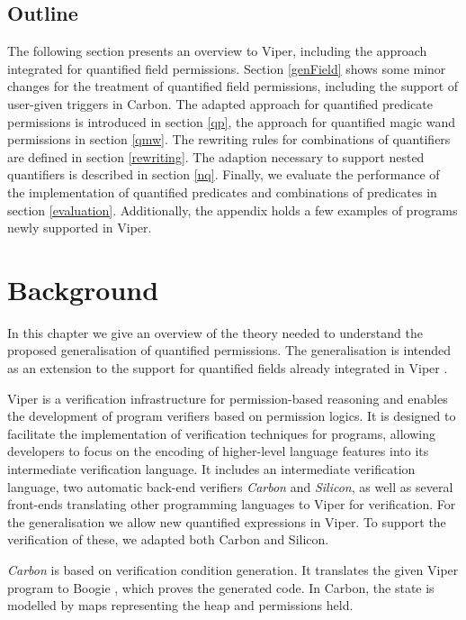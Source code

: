\documentclass[12pt]{article}
\begin{document}
\subsection{Outline}

The following section presents an overview to Viper, including the approach integrated for quantified field permissions. Section \ref{genField} shows some minor changes for the treatment of quantified field permissions, including the support of user-given triggers in Carbon. The adapted approach for quantified predicate permissions is introduced in section \ref{qp}, the approach for quantified magic wand permissions in section \ref{qmw}. The rewriting rules for combinations of quantifiers are defined in section \ref{rewriting}. The adaption necessary to support nested quantifiers is described in section \ref{nq}. Finally, we evaluate the performance of the implementation of quantified predicates and combinations of predicates in section \ref{evaluation}. Additionally, the appendix holds a few examples of programs newly supported in Viper.


\section{Background}
\label{background}
In this chapter we give an overview of the theory needed to understand the proposed generalisation of quantified permissions. The generalisation is intended as an extension to the support for quantified fields already integrated in Viper \cite{viper}\cite{viper2014}.

Viper is a verification infrastructure for permission-based reasoning and enables the development of program verifiers based on permission logics. It is designed to facilitate the implementation of verification techniques for programs, allowing developers to focus on the encoding of higher-level language features into its intermediate verification language. It includes an intermediate verification language, two automatic back-end verifiers \textit{Carbon} and \textit{Silicon}, as well as several front-ends translating other programming languages to Viper for verification. For the generalisation we allow new quantified expressions in Viper. To support the verification of these, we adapted both Carbon and Silicon. 

\textit{Carbon}  is based on verification condition generation. It translates the given Viper program to Boogie \cite{leino2008boogie}, which proves the generated code.
In Carbon, the state is modelled by maps representing the heap and permissions held.
\end{document}
